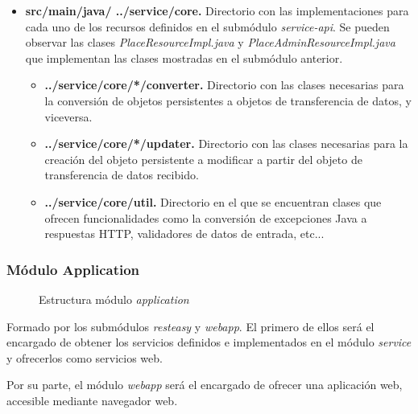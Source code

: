 \begin{itemize}
	\item \textbf{src/main/java/ ../service/core. } Directorio con las implementaciones para cada uno de los recursos definidos en el submódulo \textit{service-api}. Se pueden observar las clases \textit{PlaceResourceImpl.java} y \textit{PlaceAdminResourceImpl.java} que implementan las clases mostradas en el submódulo anterior.
	\begin{itemize}
		\item \textbf{../service/core/*/converter. }Directorio con las clases necesarias para la conversión de objetos persistentes a objetos de transferencia de datos, y viceversa.
		\item \textbf{../service/core/*/updater. }Directorio con las clases necesarias para la creación del objeto persistente a modificar a partir del objeto de transferencia de datos recibido. 
		\item \textbf{../service/core/util. }Directorio en el que se encuentran clases que ofrecen funcionalidades como la conversión de excepciones Java a respuestas HTTP, validadores de datos de entrada, etc...
	\end{itemize}
\end{itemize}



\subsubsection*{Módulo Application}
\begin{figure}[H]
\centering
{}
\caption{Estructura módulo \textit{application}}
\end{figure}

Formado por los submódulos \textit{resteasy} y \textit{webapp}. El primero de ellos será el encargado de obtener los servicios definidos e implementados en el módulo \textit{service} y ofrecerlos como servicios web. 

Por su parte, el módulo \textit{webapp} será el encargado de ofrecer una aplicación web, accesible mediante navegador web. 



